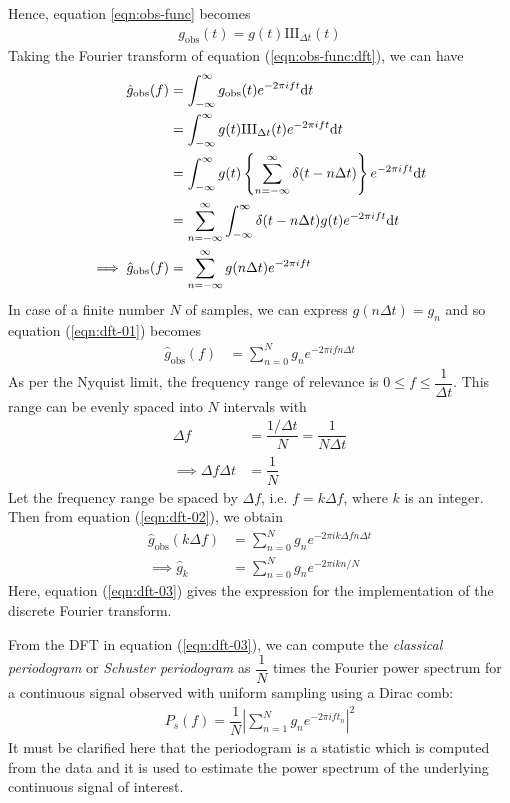     			Hence, equation \ref{eqn:obs-func} becomes
    			\begin{align}
    				g_\text{obs}(t)=g(t)\text{III}_{\Delta t}(t) \label{eqn:obs-func:dft}
    			\end{align}
    			Taking the Fourier transform of equation (\ref{eqn:obs-func:dft}), we can have
    			\begin{align}
    				\hat{g}_\text{obs}(f)&=\int_{-\infty}^{\infty}{g_\text{obs}(t) e^{-2\pi i f t}\mathrm{d}t} \nonumber \\
    					&=\int_{-\infty}^{\infty}{g(t)\text{III}_{\Delta t}(t) e^{-2\pi i f t}\mathrm{d}t} \nonumber \\
    					&=\int_{-\infty}^{\infty}{g(t)\left\lbrace \sum_{n=-\infty}^{\infty}{\delta(t-n\Delta t)} \right\rbrace e^{-2\pi i f t}\mathrm{d}t} \nonumber \\
    					&=\sum_{n=-\infty}^{\infty}{\int_{-\infty}^{\infty}{\delta(t-n\Delta t)g(t)e^{-2\pi ift}\mathrm{d}t}} \nonumber \\
    				\implies\hat{g}_\text{obs}(f)&=\sum_{n=-\infty}^{\infty}{g(n\Delta t)e^{-2\pi ift}} \label{eqn:dft-01}
    			\end{align}
    			In case of a finite number $N$ of samples, we can express $g(n\Delta t)=g_n$ and so equation (\ref{eqn:dft-01}) becomes
    			\begin{align}
    				\hat{g}_\text{obs}(f)&=\sum_{n=0}^{N}{g_ne^{-2\pi ifn\Delta t}} \label{eqn:dft-02}
    			\end{align}
    			As per the Nyquist limit, the frequency range of relevance is $0\leqslant f\leqslant\dfrac{1}{\Delta t}$. This range can be evenly spaced into $N$ intervals with
    			\begin{align*}
    				\Delta f&=\dfrac{1/{\Delta t}}{N}=\dfrac{1}{N\Delta t} \\
    				\implies\Delta f\Delta t&=\dfrac{1}{N}
    			\end{align*}
    			Let the frequency range be spaced by $\Delta f$, i.e. $f=k\Delta f$, where $k$ is an integer. Then from equation (\ref{eqn:dft-02}), we obtain
    			\begin{align}
    				\hat{g}_\text{obs}(k\Delta f)&=\sum_{n=0}^{N}{g_ne^{-2\pi ik\Delta fn\Delta t}} \nonumber \\
    				\implies \hat{g}_k&=\sum_{n=0}^{N}{g_ne^{-2\pi ikn/N}} \label{eqn:dft-03}
    			\end{align}
    			Here, equation (\ref{eqn:dft-03}) gives the expression for the implementation of the discrete Fourier transform.
    			
    			From the DFT in equation (\ref{eqn:dft-03}), we can compute the \textit{classical periodogram} or \textit{Schuster periodogram} \cite{schuster1898investigation} as $\dfrac{1}{N}$ times the Fourier power spectrum for a continuous signal observed with uniform sampling using a Dirac comb:
    			\begin{align}
    				P_s(f)=\dfrac{1}{N}\left| \sum_{n=1}^{N}{g_ne^{-2\pi i ft_n}} \right|^2 \label{eqn:schuster-periodogram}
    			\end{align}
    			It must be clarified here that the periodogram is a statistic which is computed from the data and it is used to estimate the power spectrum of the underlying continuous signal of interest.
    			
